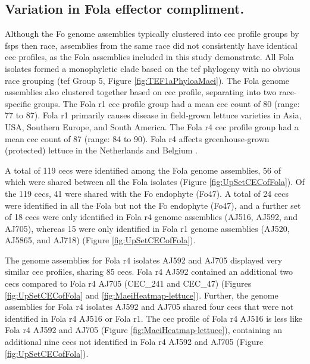 \subsection{Variation in \acl{Fola} effector compliment.}
\label{FolaMaei}

Although the \ac{Fo} genome assemblies typically clustered into \ac{cec} profile groups by \acp{fsp} then race, assemblies from the same race did not consistently have identical \ac{cec} profiles, as the \ac{Fola} assemblies included in this study demonstrate. All \ac{Fola} isolates formed a monophyletic clade based on the \ac{tef} phylogeny with no obvious race grouping (\ac{tef} Group 5, Figure \ref{fig:TEF1aPhyloaMaei}). The \ac{Fola} genome assemblies also clustered together based on \ac{cec} profile, separating into two race-specific groups. The \ac{Fola} \ac{r1} \ac{cec} profile group had a mean \ac{cec} count of 80 (range: 77 to 87). \ac{Fola} \ac{r1} primarily causes disease in field-grown lettuce varieties in Asia, USA, Southern Europe, and South America. The \ac{Fola} \ac{r4} \ac{cec} profile group had a mean \ac{cec} count of 87  (range: 84 to 90). \ac{Fola} \ac{r4} affects greenhouse-grown (protected) lettuce in the Netherlands and Belgium \parencite{Mestdagh2023}. 

A total of 119 \acp{cec} were identified among the \ac{Fola} genome assemblies, 56 of which were shared between all the \ac{Fola} isolates (Figure \ref{fig:UpSetCECofFola}). Of the 119 \acp{cec}, 41 were shared with the \ac{Fo} endophyte (Fo47). A total of 24 \acp{cec} were identified in all the \ac{Fola} but not the \ac{Fo} endophyte (Fo47), and a further set of 18 \acp{cec} were only identified in \ac{Fola} \ac{r4} genome assemblies (AJ516, AJ592, and AJ705), whereas 15 were only identified in \ac{Fola} \ac{r1} genome assemblies (AJ520, AJ5865, and AJ718) (Figure \ref{fig:UpSetCECofFola}). 

The genome assemblies for \ac{Fola} \ac{r4} isolates AJ592 and AJ705 displayed very similar \ac{cec} profiles, sharing 85 \acp{cec}. \ac{Fola} \ac{r4}  AJ592 contained an additional two \acp{cec} compared to \ac{Fola} \ac{r4}  AJ705 (CEC\_241 and CEC\_47) (Figures \ref{fig:UpSetCECofFola} and \ref{fig:MaeiHeatmap-lettuce}).  Further, the genome assemblies for \ac{Fola} \ac{r4} isolates  AJ592 and AJ705 shared four \acp{cec} that were not identified in \ac{Fola} \ac{r4}  AJ516 or \ac{Fola} \ac{r1}. The \ac{cec} profile of \ac{Fola} \ac{r4}  AJ516 is less like \ac{Fola} \ac{r4} AJ592 and AJ705 (Figure \ref{fig:MaeiHeatmap-lettuce}), containing an additional nine \acp{cec} not identified in \ac{Fola} \ac{r4} AJ592 and AJ705 (Figure \ref{fig:UpSetCECofFola}). 

